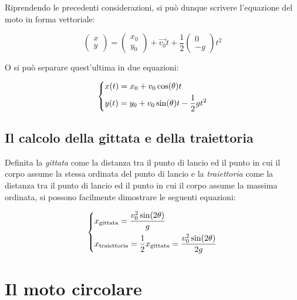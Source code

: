 \documentclass[oneside]{book}
\begin{document}
Riprendendo le precedenti considerazioni, si può dunque scrivere
l'equazione del moto in forma vettoriale:

\begin{equation}
    \begin{pmatrix}
        x \\
        y
    \end{pmatrix} = \begin{pmatrix}
        x_0 \\
        y_0
    \end{pmatrix} + \vec{v_0} t + \frac12 \begin{pmatrix}
        0 \\
        -g
    \end{pmatrix} t^2
\end{equation}

O si può separare quest'ultima in due equazioni:

\begin{equation}
    \begin{dcases}
        x(t)=x_0+v_0\cos(\theta)t \\
        y(t)=y_0+v_0\sin(\theta)t-\frac12gt^2
    \end{dcases}
\end{equation}

\subsection{Il calcolo della gittata e della traiettoria}

Definita la \textit{gittata} come la distanza tra il punto di lancio ed
il punto in cui il corpo assume la stessa ordinata del punto di lancio e
la \textit{traiettoria} come la distanza tra il punto di lancio ed il
punto in cui il corpo assume la massima ordinata, si possono facilmente
dimostrare le seguenti equazioni:

\begin{equation}
    \displaystyle
    \begin{dcases}
        x_{\text{gittata}} = \frac{v_0^2 \sin(2\theta)}{g} \\
        x_{\text{traiettoria}} = \frac12 x_{\text{gittata}} = \frac{v_0^2 \sin(2\theta)}{2g}
    \end{dcases}
\end{equation}

\section{Il moto circolare}
\end{document}
